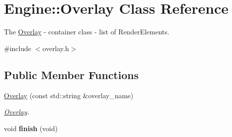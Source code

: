 \hypertarget{classEngine_1_1Overlay}{}\section{Engine\+:\+:Overlay Class Reference}
\label{classEngine_1_1Overlay}


The \hyperlink{classEngine_1_1Overlay}{Overlay} -\/ container class -\/ list of Render\+Elements.  




{\ttfamily \#include $<$overlay.\+h$>$}

\subsection*{Public Member Functions}
\begin{DoxyCompactItemize}
\item 
\hyperlink{classEngine_1_1Overlay_a0d4fec7570e42302be58751898124a54}{Overlay} (const std\+::string \&overlay\+\_\+name)
\begin{DoxyCompactList}\small\item\em \hyperlink{classEngine_1_1Overlay}{Overlay}. \end{DoxyCompactList}\item 
\hypertarget{classEngine_1_1Overlay_a57c16b1fd756a67169ede7623c3a1acf}{}void {\bfseries finish} (void)\label{classEngine_1_1Overlay_a57c16b1fd756a67169ede7623c3a1acf}


\end{DoxyCompactItemize}
